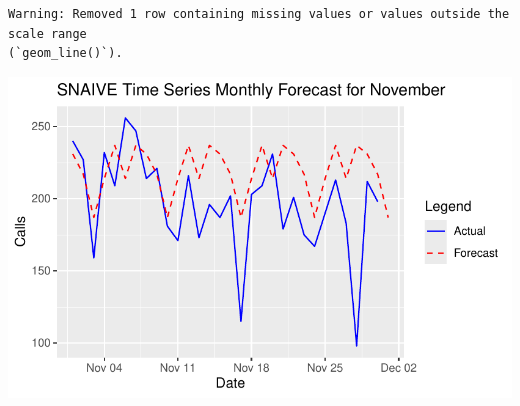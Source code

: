 \documentclass[
  letterpaper,
  DIV=11,
  numbers=noendperiod]{scrartcl}
\begin{document}
\begin{verbatim}
Warning: Removed 1 row containing missing values or values outside the scale range
(`geom_line()`).
\end{verbatim}

\includegraphics{final_proj_group1_files/figure-pdf/visualize_november-1.pdf}
\end{document}
